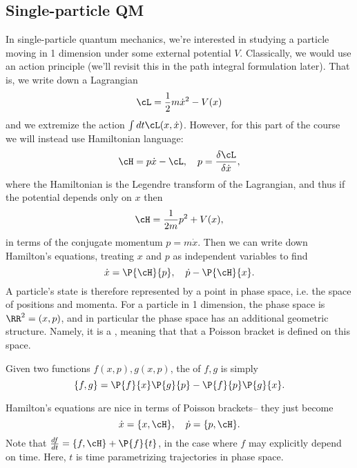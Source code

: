 \subsection*{Single-particle QM}
In single-particle quantum mechanics, we're interested in studying a particle moving in 1 dimension under some external potential $V$. Classically, we would use an action principle (we'll revisit this in the path integral formulation later). That is, we write down a Lagrangian
\begin{equation}
    \cL = \frac{1}{2} m\dot x^2 - V(x)
\end{equation}
and we extremize the action $\int dt \cL(x,\dot x)$. However, for this part of the course we will instead use Hamiltonian language:
\begin{equation}
    \cH=p \dot x -\cL,\quad p = \frac{\delta \cL}{\delta \dot x},
\end{equation}
where the Hamiltonian is the Legendre transform of the Lagrangian, and thus if the potential depends only on $x$ then
\begin{equation}
    \cH = \frac{1}{2m} p^2 +V(x),
\end{equation}
in terms of the conjugate momentum $p=m\dot x$. Then we can write down Hamilton's equations, treating $x$ and $p$ as independent variables to find
\begin{equation}
    \dot x = \P{\cH}{p},\quad \dot p - \P{\cH}{x}.
\end{equation}
A particle's state is therefore represented by a point in phase space, i.e. the space of positions and momenta. For a particle in 1 dimension, the phase space is $\RR^2=(x,p)$, and in particular the phase space has an additional geometric structure. Namely, it is a , meaning that that a Poisson bracket is defined on this space.

\begin{defn}
    Given two functions $f(x,p),g(x,p)$, the  of $f,g$ is simply
    \begin{equation}
        \set{f,g}=\P{f}{x}\P{g}{p} -\P{f}{p} \P{g}{x}.
    \end{equation}
\end{defn}
Hamilton's equations are nice in terms of Poisson brackets-- they just become
\begin{equation}
    \dot x = \set{x,\cH}, \quad \dot p =\set{p,\cH}.
\end{equation}
Note that $\frac{df}{dt} =\set{f,\cH}+\P{f}{t}$, in the case where $f$ may explicitly depend on time. Here, $t$ is time parametrizing trajectories in phase space.


